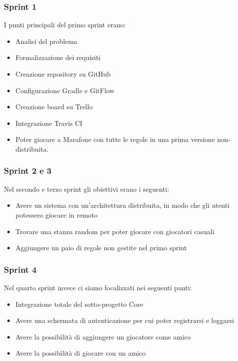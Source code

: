 \subsubsection{Sprint 1}
I punti principali del primo sprint erano:
 \begin {itemize}
  \item Analisi del problema
  \item Formalizzazione dei requisiti
  \item Creazione repository su GitHub
  \item Configurazione Gradle e GitFlow
  \item Creazione board su Trello
  \item Integrazione Travis CI
  \item Poter giocare a Marafone con tutte le regole in una prima versione non-distribuita.
\end {itemize}

\subsubsection{Sprint 2 e 3}
Nel secondo e terzo sprint gli obiettivi erano i seguenti:
 \begin {itemize}
  \item Avere un sistema con un'architettura distribuita, in modo che gli utenti potessero giocare in remoto
  \item Trovare una stanza random per poter giocare con giocatori casuali
  \item Aggiungere un paio di regole non gestite nel primo sprint
\end {itemize} 

\subsubsection{Sprint 4}
Nel quarto sprint invece ci siamo focalizzati nei seguenti punti:
 \begin {itemize}
  \item Integrazione totale del sotto-progetto Core
  \item Avere una schermata di autenticazione per cui poter registrarsi e loggarsi
  \item Avere la possibilità di aggiungere un giocatore come amico
  \item Avere la possibilità di giocare con un amico
\end {itemize} 


